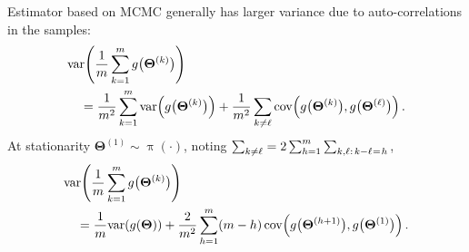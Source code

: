 \documentclass[18pt]{beamer}
\newcommand{\spacedColon}{\mkern .5mu : \mkern 1mu}
\newcommand{\spacedEq}{\mkern 1mu = \mkern 1.5mu}
\newcommand{\thinnerspace}{\mskip.5\thinmuskip}
\DeclareMathOperator{\density}{\pi}
\newcommand{\randVar}{\Theta}
\newcommand{\brandVar}{\bm{\randVar}}
\newcommand{\mcmc}{{\small MCMC}}
\newcommand{\mcIndex}{k}
\newcommand{\altMcIndex}{\ell}
\newcommand{\mcSampleSize}{m}
\newcommand{\lag}{h}
\begin{document}
\begin{frame}
\frametitle{\frametitleText}

Estimator based on \mcmc{} generally has larger variance due to auto-correlations in the samples:
\vspace*{-.3\baselineskip}
{\setlength{\belowdisplayskip}{.4\baselineskip}
\begin{align*}
&\mathrm{var} \!\left( \frac{1}{\mcSampleSize} \sum_{\mcIndex = 1}^\mcSampleSize g\bigl( \brandVar^{(\mcIndex)} \bigr) \right) \\
	&\hspace*{1em}= \frac{1}{\mcSampleSize^2} \sum_{\mcIndex = 1}^\mcSampleSize \mathrm{var} \!\left( g\bigl( \brandVar^{(\mcIndex)} \bigr) \right)
	+ \frac{1}{\mcSampleSize^2} \sum_{\mcIndex \neq \altMcIndex} \mathrm{cov} \!\left( g\bigl( \brandVar^{(\mcIndex)} \bigr), g\bigl( \brandVar^{(\altMcIndex)} \bigr)  \right).
\end{align*}
}%
\pause%
At stationarity $\brandVar^{(1)} \sim \density(\cdot)$, noting
$\sum_{\mcIndex \neq \altMcIndex} = 2 \sum_{\lag = 1}^\mcSampleSize \sum_{\mcIndex, \altMcIndex \spacedColon \thinnerspace \mcIndex - \altMcIndex \spacedEq \lag} \thinnerspace$,
\vspace*{-.3\baselineskip}
\begin{align*}
&\mathrm{var} \!\left( \frac{1}{\mcSampleSize} \sum_{\mcIndex = 1}^\mcSampleSize g\bigl( \brandVar^{(\mcIndex)} \bigr) \right) \\
	&\hspace*{1em}= \frac{1}{\mcSampleSize} \mathrm{var} \!\left( g(\brandVar) \right)
	+ \frac{2}{\mcSampleSize^2} \sum_{\lag = 1}^\mcSampleSize (\mcSampleSize - \lag) \operatorname{cov} \!\left( g\bigl( \brandVar^{(\lag + 1)} \bigr), g\bigl( \brandVar^{(1)} \bigr)  \right).
\end{align*}
\end{frame}
\end{document}
